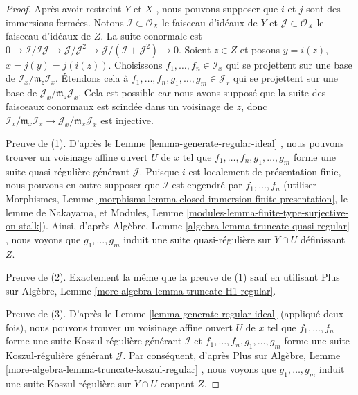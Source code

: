 \begin{proof}
Après avoir restreint  $Y$  et  $X$ , nous pouvons supposer que
 $i$  et  $j$  sont des immersions fermées. Notons  $\mathcal{I} \subset \mathcal{O}_X$  le
faisceau d'idéaux de  $Y$  et  $\mathcal{J} \subset \mathcal{O}_X$  le faisceau d'idéaux de
 $Z$. La suite conormale est  $0 \to \mathcal{I}/\mathcal{I}\mathcal{J}
\to \mathcal{J}/\mathcal{J}^2 \to
\mathcal{J}/(\mathcal{I} + \mathcal{J}^2) \to 0$. Soient  $z \in Z$  et posons
 $y = i(z)$,  $x = j(y) = j(i(z))$. Choisissons  $f_1, \ldots, f_n \in \mathcal{I}_x$  qui se projettent sur une
base de  $\mathcal{I}_x/\mathfrak m_z\mathcal{I}_x$. Étendons cela à  $f_1, \ldots, f_n, g_1, \ldots, g_m \in \mathcal{J}_x$  qui se projettent sur une base
de  $\mathcal{J}_x/\mathfrak m_z\mathcal{J}_x$. Cela est possible car nous avons supposé que la suite des
faisceaux conormaux est scindée dans un voisinage de  $z$, donc
 $\mathcal{I}_x/\mathfrak m_x\mathcal{I}_x \to
\mathcal{J}_x/\mathfrak m_x\mathcal{J}_x$  est injective.

\medskip\noindent
Preuve de (1). D'après le Lemme  \ref{lemma-generate-regular-ideal} , nous pouvons trouver un voisinage
affine ouvert  $U$  de  $x$  tel que  $f_1, \ldots, f_n, g_1, \ldots, g_m$  forme une suite
quasi-régulière générant  $\mathcal{J}$. Puisque  $i$  est localement de
présentation finie, nous pouvons en outre supposer que  $\mathcal{I}$  est engendré
par  $f_1, \ldots, f_n$  (utiliser Morphismes, Lemme  \ref{morphisms-lemma-closed-immersion-finite-presentation}, le lemme de Nakayama,
et Modules, Lemme  \ref{modules-lemma-finite-type-surjective-on-stalk}). Ainsi, d'après Algèbre, Lemme  \ref{algebra-lemma-truncate-quasi-regular} , nous
voyons que  $g_1, \ldots, g_m$  induit une suite quasi-régulière sur  $Y \cap U$ 
définissant  $Z$.

\medskip\noindent
Preuve de (2). Exactement la même que la preuve de (1) sauf en utilisant Plus sur
Algèbre, Lemme  \ref{more-algebra-lemma-truncate-H1-regular}.

\medskip\noindent
Preuve de (3). D'après le Lemme  \ref{lemma-generate-regular-ideal}  (appliqué deux fois), nous pouvons
trouver un voisinage affine ouvert  $U$  de  $x$  tel que
 $f_1, \ldots, f_n$  forme une suite Koszul-régulière générant  $\mathcal{I}$  et
 $f_1, \ldots, f_n, g_1, \ldots, g_m$  forme une suite Koszul-régulière générant  $\mathcal{J}$. Par
conséquent, d'après Plus sur Algèbre, Lemme  \ref{more-algebra-lemma-truncate-koszul-regular} , nous voyons que
 $g_1, \ldots, g_m$  induit une suite Koszul-régulière sur  $Y \cap U$  coupant
 $Z$.
\end{proof}


